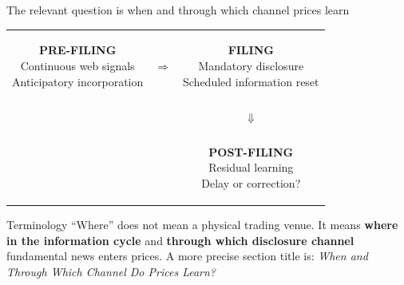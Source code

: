 \documentclass[aspectratio=169,10pt]{beamer}
\begin{document}
\begin{frame}[t]{The relevant question is when and through which channel prices learn}
\begin{center}
\begin{tabular}{ccc}
\colorbox{SoftBlue}{\parbox{0.27\textwidth}{\centering\textbf{PRE-FILING}\\Continuous web signals\\Anticipatory incorporation}} &
$\Longrightarrow$ &
\colorbox{SoftBlue}{\parbox{0.27\textwidth}{\centering\textbf{FILING}\\Mandatory disclosure\\Scheduled information reset}} \\
&&\\[-0.18cm]
&& $\Downarrow$ \\
&&\\[-0.18cm]
&& \colorbox{SoftGray}{\parbox{0.27\textwidth}{\centering\textbf{POST-FILING}\\Residual learning\\Delay or correction?}}
\end{tabular}
\end{center}

\begin{block}{Terminology}
\small
``Where'' does not mean a physical trading venue. It means \textbf{where in the information cycle} and \textbf{through which disclosure channel} fundamental news enters prices. A more precise section title is: \emph{When and Through Which Channel Do Prices Learn?}
\end{block}

\end{frame}
\end{document}
